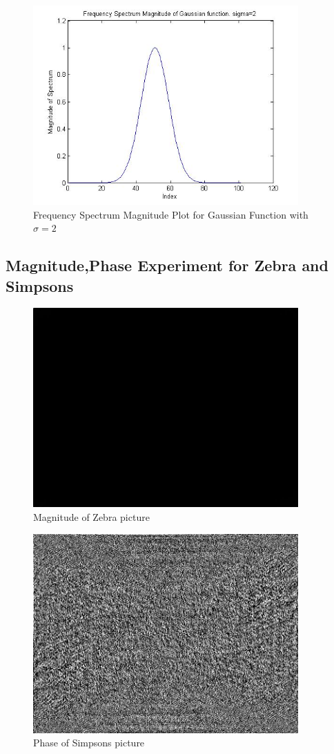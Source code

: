 \documentclass[11pt,psfig]{article}
\begin{document}
\begin{figure}[H]
\centering
\includegraphics[height=3in]{prob6plot_freqGauss2.jpg}
\caption{Frequency Spectrum Magnitude Plot for Gaussian Function with $\sigma=2$}
\end{figure}

\subsection*{Magnitude,Phase Experiment for Zebra and Simpsons}

\begin{figure}[H]
\centering
\includegraphics[height=3in]{magImage_zebraMod.jpg}
\caption{Magnitude of Zebra picture}
\end{figure}

\begin{figure}[H]
\centering
\includegraphics[height=3in]{phaseImage_zebraMod.jpg}
\caption{Phase of Simpsons picture}
\end{figure}
\end{document}
